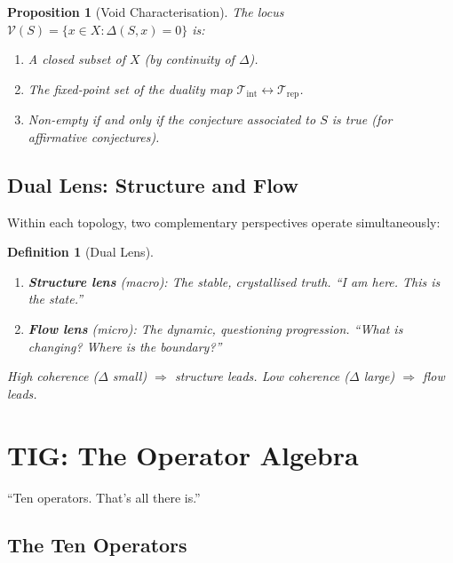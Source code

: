 \documentclass[12pt, openany]{book}
\newtheorem{proposition}[theorem]{Proposition}
\newtheorem{definition}[theorem]{Definition}
\theoremstyle{remark}
\newcommand{\Tint}{\mathcal{T}_{\mathrm{int}}}
\newcommand{\Trep}{\mathcal{T}_{\mathrm{rep}}}
\begin{document}
\begin{proposition}[Void Characterisation]
\label{prop:void}
The locus $\mathcal{V}(S) = \{x \in X : \Delta(S, x) = 0\}$ is:
\begin{enumerate}
  \item A closed subset of $X$ (by continuity of $\Delta$).
  \item The fixed-point set of the duality map $\Tint \leftrightarrow \Trep$.
  \item Non-empty if and only if the conjecture associated to $S$ is true
        (for affirmative conjectures).
\end{enumerate}
\end{proposition}

\section{Dual Lens: Structure and Flow}

Within each topology, two complementary perspectives operate simultaneously:

\begin{definition}[Dual Lens]
\label{def:dual-lens}
\begin{enumerate}
  \item \textbf{Structure lens} (macro): The stable, crystallised truth.
        ``I am here. This is the state.''
  \item \textbf{Flow lens} (micro): The dynamic, questioning progression.
        ``What is changing? Where is the boundary?''
\end{enumerate}
High coherence ($\Delta$ small) $\Rightarrow$ structure leads.
Low coherence ($\Delta$ large) $\Rightarrow$ flow leads.
\end{definition}


\chapter{TIG: The Operator Algebra}
\label{ch:tig}

\epigraph{``Ten operators. That's all there is.''}{}

\section{The Ten Operators}
\end{document}
